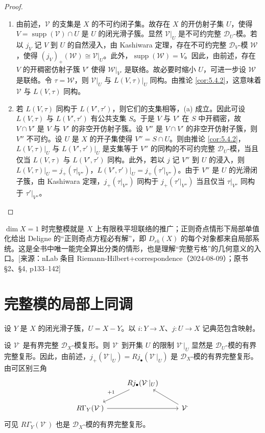 \begin{proof}
\begin{enumerate}[label=(\roman*)]
  \item 由前述，$\mathcal{V}$ 的支集是 $X$ 的不可约闭子集。故存在 $X$ 的开仿射子集 $U$，使得 $V=\operatorname{supp}(\mathcal{V})\cap U$ 是 $U$ 的闭光滑子簇。显然 $\mathcal{V}|_U$ 是不可约完整 $\mathcal{D}_U$-模。若以 $j_V$ 记 $V$ 到 $U$ 的自然浸入，由 Kashiwara 定理，存在不可约完整 $\mathcal{D}_V$-模 $\mathcal{W}$，使得 $(j_V)_+(\mathcal{W})\cong\mathcal{V}|_U$。此外，$\operatorname{supp}(\mathcal{W})=V$。因此，由前述，存在 $V$ 的开稠密仿射子簇 $V'$ 使得 $\mathcal{W}|_{V'}$ 是联络。故必要时缩小 $U$，可进一步设 $\mathcal{W}$ 是联络。令 $\tau=\mathcal{W}$，则 $\mathcal{V}|_U$ 与 $L(V,\tau)|_U$ 同构。由推论 \ref{cor:5.4.2}，这意味着 $\mathcal{V}$ 与 $L(V,\tau)$ 同构。
  \item 若 $L(V,\tau)$ 同构于 $L(V',\tau')$，则它们的支集相等，(a) 成立。因此可设 $L(V,\tau)$ 与 $L(V',\tau')$ 有公共支集 $S$。于是 $V$ 与 $V'$ 在 $S$ 中开稠密，故 $V\cap V'$ 是 $V$ 与 $V'$ 的非空开仿射子簇。设 $V''$ 是 $V\cap V'$ 的非空开仿射子簇，则 $V''$ 不可约。设 $U$ 是 $X$ 的开子集使得 $V''=S\cap U$。则由推论 \ref{cor:5.4.2}，$L(V,\tau)|_U$ 与 $L(V',\tau')|_U$ 是支集等于 $V''$ 的同构的不可约完整 $\mathcal{D}_U$-模，当且仅当 $L(V,\tau)$ 与 $L(V',\tau')$ 同构。此外，若以 $j$ 记 $V''$ 到 $U$ 的浸入，则 $L(V,\tau)|_U=j_+(\tau|_{V''})$，$L(V',\tau')|_U=j_+(\tau'|_{V''})$。由于 $V''$ 是 $U$ 的光滑闭子簇，由 Kashiwara 定理，$j_+(\tau|_{V''})$ 同构于 $j_+(\tau'|_{V''})$ 当且仅当 $\tau|_{V''}$ 同构于 $\tau'|_{V''}$。
\end{enumerate}
\end{proof}
\begin{annote}
$\dim X=1$ 时完整模就是 $X$ 上有限秩平坦联络的推广；正则奇点情形下局部单值化给出 Deligne 的“正则奇点方程必有解”，即 $D_{rh}(X)$ 的每个对象都来自局部系统。这是全书中唯一能完全算出分类的情形，也是理解“完整亏格”的几何意义的入口。[来源：nLab 条目 Riemann-Hilbert+correspondence（2024-08-09）；原书 §2、§4, p133–142]
\end{annote}



\section{完整模的局部上同调}

设 $Y$ 是 $X$ 的闭光滑子簇，$U=X-Y$。以 $i:Y\to X$、$j:U\to X$ 记典范包含映射。

设 $\mathcal{V}^\cdot$ 是有界完整 $\mathcal{D}_X$-模复形。则 $\mathcal{V}^\cdot$ 到开集 $U$ 的限制 $\mathcal{V}^\cdot|_U$ 显然是 $\mathcal{D}_U$-模的有界完整复形。因此，由前述，$j_+(\mathcal{V}^\cdot|_U)=Rj_\bullet(\mathcal{V}^\cdot|_U)$ 是 $\mathcal{D}_X$-模的有界完整复形。由可区别三角
$$\begin{tikzcd}
& Rj_\bullet(\mathcal{V}^\cdot|_U) \arrow[dl,"+1"'] & \\
R\Gamma_Y(\mathcal{V}^\cdot) \arrow[rr] && \mathcal{V}^\cdot \arrow[lu]
\end{tikzcd}$$
可见 $R\Gamma_Y(\mathcal{V}^\cdot)$ 也是 $\mathcal{D}_X$-模的有界完整复形。

